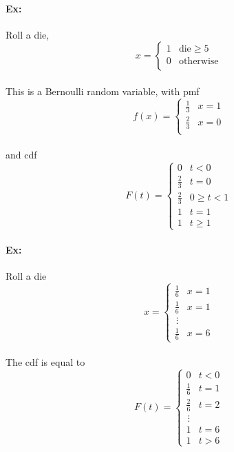 \documentclass{article}
\begin{document}
\paragraph{Ex:} Roll a die,
\[ x = \begin{cases}
    1 & \text{die} \ge 5 \\
    0 & \text{otherwise}\\
    \end{cases}
\]
\paragraph{}This is a Bernoulli random variable, with pmf
\[ f(x) = \begin{cases}
    \frac{1}{3} & x = 1 \\
    \frac{2}{3}& x = 0 \\
    \end{cases}
\]
\paragraph{}and cdf
\[ F(t) = \begin{cases}
    0 & t < 0 \\
    \frac{2}{3} & t = 0 \\
    \frac{2}{3} & 0 \ge t < 1 \\
    1 & t = 1\\
    1 & t \ge 1
    \end{cases}
\]
\paragraph{Ex:} Roll a die
\[ x = \begin{cases}
    \frac{1}{6} & x = 1 \\
    \frac{1}{6} & x = 1 \\
    \,\vdots & \\
    \frac{1}{6} & x = 6
    \end{cases}
\]
\paragraph{}The cdf is equal to
\[ F(t) = \begin{cases}
    0 & t < 0 \\
    \frac{1}{6} & t = 1 \\
    \frac{2}{6} & t = 2 \\
    \,\vdots & \\
    1 & t = 6\\
    1 & t > 6 
    \end{cases}
\]
\end{document}
